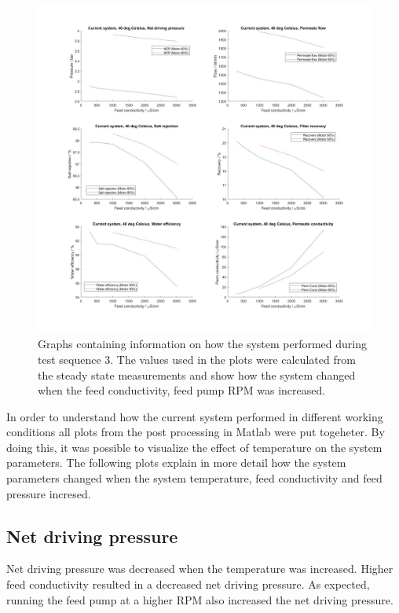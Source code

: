 \begin{figure}[H]
    \centering
    \includegraphics[width=1.1\textwidth]{Key40}
    \caption{Graphs containing information on how the system performed during test sequence 3. The values used in the plots were calculated from the steady state measurements and show how the system changed when the feed conductivity, feed pump RPM was increased.}
    \label{fig:K40}
\end{figure}

\newpage

In order to understand how the current system performed in different working conditions all plots from the post processing in Matlab were put togeheter. By doing this, it was possible to visualize the effect of temperature on the system parameters. The following plots explain in more detail how the system parameters changed when the system temperature, feed conductivity and feed pressure incresed.  

\subsection{Net driving pressure}

Net driving pressure was decreased when the temperature was increased. Higher feed conductivity resulted in a decreased net driving pressure. As expected, running the feed pump at a higher RPM also increased the net driving pressure.


